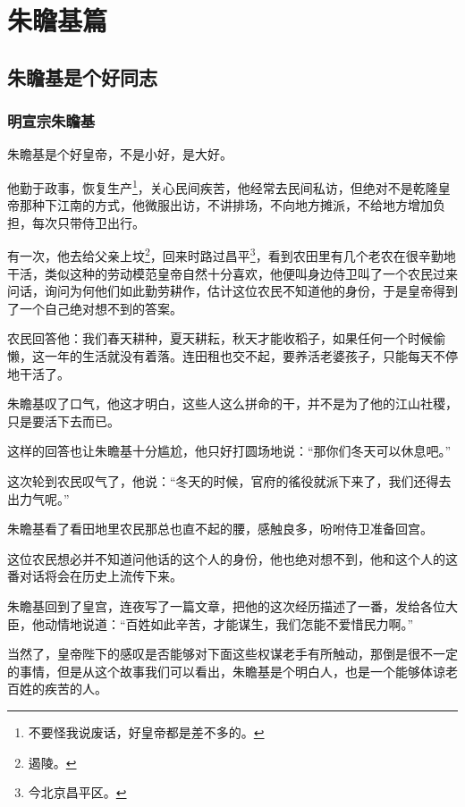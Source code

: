 \chapter*{朱瞻基篇}
\section{朱瞻基是个好同志}
\ifnum{}
	\begin{multicols}{\theparacolNo}
\fi
\subsection{明宣宗朱瞻基}
朱瞻基是个好皇帝，不是小好，是大好。

他勤于政事，恢复生产\footnote{不要怪我说废话，好皇帝都是差不多的。}，关心民间疾苦，他经常去民间私访，但绝对不是乾隆皇帝那种下江南的方式，他微服出访，不讲排场，不向地方摊派，不给地方增加负担，每次只带侍卫出行。

有一次，他去给父亲上坟\footnote{遏陵。}，回来时路过昌平\footnote{今北京昌平区。}，看到农田里有几个老农在很辛勤地干活，类似这种的劳动模范皇帝自然十分喜欢，他便叫身边侍卫叫了一个农民过来问话，询问为何他们如此勤劳耕作，估计这位农民不知道他的身份，于是皇帝得到了一个自己绝对想不到的答案。

农民回答他：我们春天耕种，夏天耕耘，秋天才能收稻子，如果任何一个时候偷懒，这一年的生活就没有着落。连田租也交不起，要养活老婆孩子，只能每天不停地干活了。

朱瞻基叹了口气，他这才明白，这些人这么拼命的干，并不是为了他的江山社稷，只是要活下去而已。

这样的回答也让朱瞻基十分尴尬，他只好打圆场地说：“那你们冬天可以休息吧。”

这次轮到农民叹气了，他说：“冬天的时候，官府的徭役就派下来了，我们还得去出力气呢。”

朱瞻基看了看田地里农民那总也直不起的腰，感触良多，吩咐侍卫准备回宫。

这位农民想必并不知道问他话的这个人的身份，他也绝对想不到，他和这个人的这番对话将会在历史上流传下来。

朱瞻基回到了皇宫，连夜写了一篇文章，把他的这次经历描述了一番，发给各位大臣，他动情地说道：“百姓如此辛苦，才能谋生，我们怎能不爱惜民力啊。”

当然了，皇帝陛下的感叹是否能够对下面这些权谋老手有所触动，那倒是很不一定的事情，但是从这个故事我们可以看出，朱瞻基是个明白人，也是一个能够体谅老百姓的疾苦的人。


\end{multicols}
